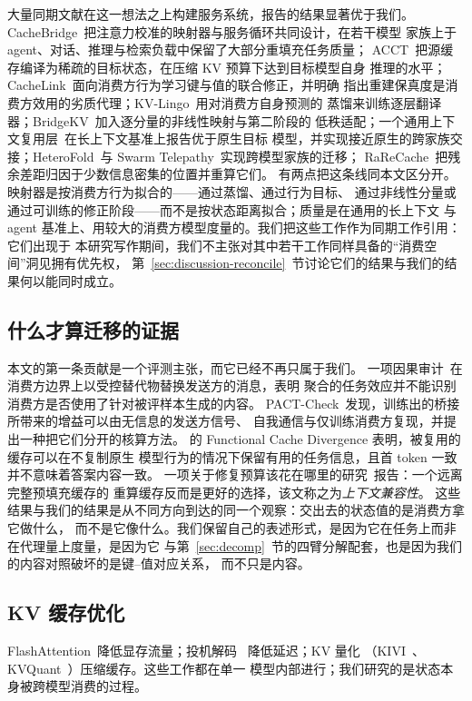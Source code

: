 \documentclass[11pt]{article}
\begin{document}
大量同期文献在这一想法之上构建服务系统，报告的结果显著优于我们。
CacheBridge~\cite{cachebridge2026}把注意力校准的映射器与服务循环共同设计，在若干模型
家族上于 agent、对话、推理与检索负载中保留了大部分重填充任务质量；
ACCT~\cite{acct2026}把源缓存编译为稀疏的目标状态，在压缩 KV 预算下达到目标模型自身
推理的水平；CacheLink~\cite{cachelink2026}面向消费方行为学习键与值的联合修正，并明确
指出重建保真度是消费方效用的劣质代理；KV-Lingo~\cite{kvlingo2026}用对消费方自身预测的
蒸馏来训练逐层翻译器；BridgeKV~\cite{bridgekv2026}加入逐分量的非线性映射与第二阶段的
低秩适配；一个通用上下文复用层~\cite{contextreuse2026}在长上下文基准上报告优于原生目标
模型，并实现接近原生的跨家族交接；HeteroFold~\cite{heterofold2026}与
Swarm Telepathy~\cite{swarmtelepathy2026}实现跨模型家族的迁移；
RaReCache~\cite{rarecache2026}把残余差距归因于少数信息密集的位置并重算它们。
有两点把这条线同本文区分开。映射器是按消费方行为拟合的——通过蒸馏、通过行为目标、
通过非线性分量或通过可训练的修正阶段——而不是按状态距离拟合；质量是在通用的长上下文
与 agent 基准上、用较大的消费方模型度量的。我们把这些工作作为同期工作引用：它们出现于
本研究写作期间，我们不主张对其中若干工作同样具备的“消费空间”洞见拥有优先权，
第~\ref{sec:discussion-reconcile}~节讨论它们的结果与我们的结果何以能同时成立。

\subsection{什么才算迁移的证据}
\label{sec:rw-evidence}
本文的第一条贡献是一个评测主张，而它已经不再只属于我们。
一项因果审计~\cite{latentaudit2026}在消费方边界上以受控替代物替换发送方的消息，表明
聚合的任务效应并不能识别消费方是否使用了针对被评样本生成的内容。
PACT-Check~\cite{pactcheck2026}发现，训练出的桥接所带来的增益可以由无信息的发送方信号、
自我通信与仅训练消费方复现，并提出一种把它们分开的核算方法。
\cite{funccache2026}的 Functional Cache Divergence 表明，被复用的缓存可以在不复制原生
模型行为的情况下保留有用的任务信息，且首 token 一致并不意味着答案内容一致。
一项关于修复预算该花在哪里的研究~\cite{repairbudget2026}报告：一个远离完整预填充缓存的
重算缓存反而是更好的选择，该文称之为\emph{上下文兼容性}。
这些结果与我们的结果是从不同方向到达的同一个观察：交出去的状态值的是消费方拿它做什么，
而不是它像什么。我们保留自己的表述形式，是因为它在任务上而非在代理量上度量，是因为它
与第~\ref{sec:decomp}~节的四臂分解配套，也是因为我们的内容对照破坏的是键--值对应关系，
而不只是内容。

\subsection{KV 缓存优化}
\label{sec:rw-kvopt}
FlashAttention~\cite{dao2022flashattention}降低显存流量；投机解码
~\cite{leviathan2023fast,chen2023accelerating}降低延迟；KV 量化
（KIVI~\cite{kivi2024icml}、KVQuant~\cite{kvquant2024nips}）压缩缓存。这些工作都在单一
模型内部进行；我们研究的是状态本身被跨模型消费的过程。
\end{document}
